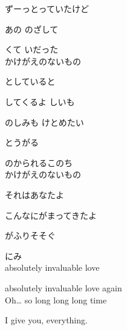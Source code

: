 {ずーっとっていたけど

あの のざして

くて いだった
\\

かけがえのないもの

としていると

してくるよ しいも

のしみも けとめたい

とうがる

のかられるこのち
\\

かけがえのないもの

それはあなたよ

こんなにがまってきたよ

がふりそそぐ

にみ
\\

absolutely invaluable love

absolutely invaluable love again
\\

Oh… so long long long time

I give you, everything.

}